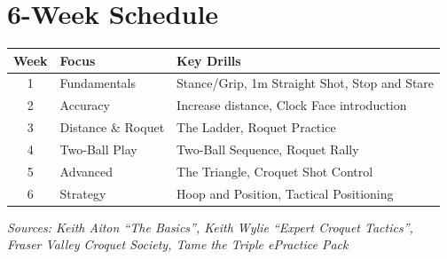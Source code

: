 \documentclass[11pt,a4paper]{article}
\begin{document}
\vspace{0.5em}

\section*{6-Week Schedule}

\begin{tabular}{@{}clp{9cm}@{}}
\toprule
\textbf{Week} & \textbf{Focus} & \textbf{Key Drills} \\
\midrule
1 & Fundamentals & Stance/Grip, 1m Straight Shot, Stop and Stare \\
2 & Accuracy & Increase distance, Clock Face introduction \\
3 & Distance \& Roquet & The Ladder, Roquet Practice \\
4 & Two-Ball Play & Two-Ball Sequence, Roquet Rally \\
5 & Advanced & The Triangle, Croquet Shot Control \\
6 & Strategy & Hoop and Position, Tactical Positioning \\
\bottomrule
\end{tabular}

\vfill

\begin{center}
{\small\textit{Sources: Keith Aiton ``The Basics'', Keith Wylie ``Expert Croquet Tactics'',\\
Fraser Valley Croquet Society, Tame the Triple ePractice Pack}}
\end{center}
\end{document}
